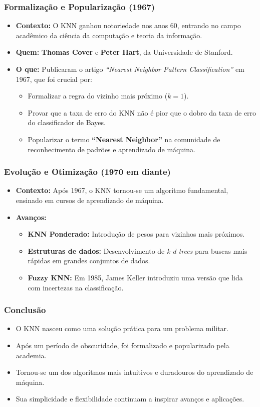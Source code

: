 \documentclass{beamer}
\begin{document}
\begin{frame}
\frametitle{Formalização e Popularização (1967)}
\begin{itemize}
\item<1-> \textbf{Contexto:} O KNN ganhou notoriedade nos anos 60, entrando no campo acadêmico da ciência da computação e teoria da informação.
\item<2-> \textbf{Quem:} \textbf{Thomas Cover} e \textbf{Peter Hart}, da Universidade de Stanford.
\item<3-> \textbf{O que:} Publicaram o artigo \textit{``Nearest Neighbor Pattern Classification''} em 1967, que foi crucial por:
\begin{itemize}
\item<4-> Formalizar a regra do vizinho mais próximo (\(k=1\)).
\item<5-> Provar que a taxa de erro do KNN não é pior que o dobro da taxa de erro do classificador de Bayes.
\item<6-> Popularizar o termo \textbf{``Nearest Neighbor''} na comunidade de reconhecimento de padrões e aprendizado de máquina.
\end{itemize}
\end{itemize}
\end{frame}

\begin{frame}
\frametitle{Evolução e Otimização (1970 em diante)}
\begin{itemize}
\item<1-> \textbf{Contexto:} Após 1967, o KNN tornou-se um algoritmo fundamental, ensinado em cursos de aprendizado de máquina.
\item<2-> \textbf{Avanços:}
\begin{itemize}
\item<3-> \textbf{KNN Ponderado:} Introdução de pesos para vizinhos mais próximos.
\item<4-> \textbf{Estruturas de dados:} Desenvolvimento de \textit{k-d trees} para buscas mais rápidas em grandes conjuntos de dados.
\item<5-> \textbf{Fuzzy KNN:} Em 1985, James Keller introduziu uma versão que lida com incertezas na classificação.
\end{itemize}
\end{itemize}
\end{frame}

\begin{frame}
\frametitle{Conclusão}
\begin{itemize}
\item O KNN nasceu como uma solução prática para um problema militar.
\item Após um período de obscuridade, foi formalizado e popularizado pela academia.
\item Tornou-se um dos algoritmos mais intuitivos e duradouros do aprendizado de máquina.
\item Sua simplicidade e flexibilidade continuam a inspirar avanços e aplicações.
\end{itemize}
\end{frame}
\end{document}
